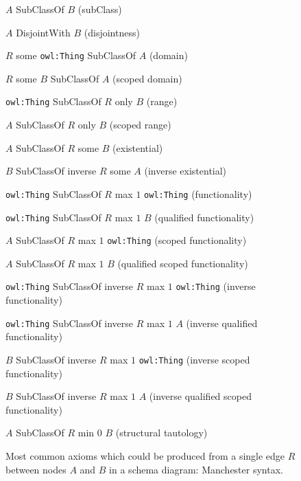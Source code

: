 \begin{figure}[tb]
\begin{compactenum}
\item $A$ \textsf{SubClassOf} $B$ \hfill (subClass)
\item $A$ \textsf{DisjointWith} $B$ \hfill (disjointness)
\item $R$ \textsf{some} \texttt{owl:Thing} \textsf{SubClassOf} $A$ \hfill (domain)
\item $R$ \textsf{some} $B$ \textsf{SubClassOf} $A$ \hfill (scoped domain)
\item \texttt{owl:Thing} \textsf{SubClassOf} $R$ \textsf{only} $B$ \hfill (range)
\item $A$ \textsf{SubClassOf} $R$ \textsf{only} $B$ \hfill (scoped range)
\item $A$ \textsf{SubClassOf} $R$ \textsf{some} $B$ \hfill (existential)
\item $B$ \textsf{SubClassOf inverse} $R$ \textsf{some} $A$ \hfill (inverse existential)
\item \texttt{owl:Thing} \textsf{SubClassOf} $R$ \textsf{max} $1$ \texttt{owl:Thing} \hfill (functionality)
\item \texttt{owl:Thing} \textsf{SubClassOf} $R$ \textsf{max} $1$ $B$ \hfill (qualified functionality)
\item $A$ \textsf{SubClassOf} $R$ \textsf{max} $1$ \texttt{owl:Thing} \hfill (scoped functionality)
\item $A$ \textsf{SubClassOf} $R$ \textsf{max} $1$ $B$ \hfill (qualified scoped functionality)
\item \texttt{owl:Thing} \textsf{SubClassOf inverse} $R$ \textsf{max} $1$ \texttt{owl:Thing} \hfill (inverse functionality)
\item \texttt{owl:Thing} \textsf{SubClassOf inverse} $R$ \textsf{max} $1$ $A$ \hfill (inverse qualified functionality)
\item $B$ \textsf{SubClassOf inverse} $R$ \textsf{max} $1$ \texttt{owl:Thing} \hfill (inverse scoped functionality)
\item $B$ \textsf{SubClassOf inverse} $R$ \textsf{max} $1$ $A$ \hfill (inverse qualified scoped functionality)
\item $A$ \textsf{SubClassOf} $R$ \textsf{min} $0$ $B$ \hfill (structural tautology)
\end{compactenum}
\caption{Most common axioms which could be produced from a single edge $R$ between nodes $A$ and $B$ in a schema diagram: Manchester syntax.}\label{fig:generic-triple-axioms-Manchester}
\end{figure}

